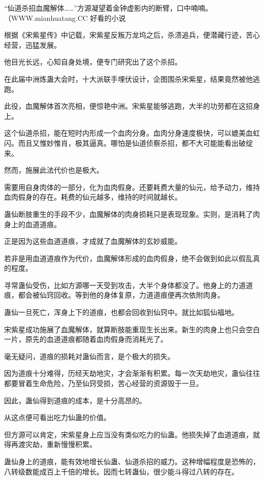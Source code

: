 
\begin{this_body}

“仙道杀招血魔解体……”方源凝望着金钟虚影内的断臂，口中喃喃。（WWW.mianhuatang.CC 好看的小说

根据《宋紫星传》中记载，宋紫星反叛万龙坞之后，杀溃追兵，便潜藏行迹，苦心经营，迅猛发展。

他目光长远，心知自身处境，便专门研究出了这个杀招。

在此届中洲炼蛊大会时，十大派联手埋伏设计，企图围杀宋紫星，结果竟然被他逃跑。

此役，血魔解体首次亮相，便惊艳中洲。宋紫星能够逃跑，大半的功劳都在这招身上。

这个仙道杀招，能在短时内形成一个血肉分身。血肉分身速度极快，可以媲美血虹闪。而且又惟妙惟肖，极其逼真。哪怕是仙道侦察杀招，都不大可能能看出破绽来。

然而，施展此法代价也是极大。

需要用自身肉体的一部分，化为血肉假身。还要耗费大量的仙元，给予动力，维持血肉假身的存在。耗费的仙元越多，维持的时间就越长。

蛊仙断肢重生的手段不少，血魔解体的肉身损耗只是表现现象。实则，是消耗了肉身上的血道道痕。

正是因为这些血道道痕，才成就了血魔解体的玄妙威能。

若非是用血道道痕作为代价，血魔解体形成的血肉假身，绝不会做到如此以假乱真的程度。

寻常蛊仙受伤，比如方源哪一天受到攻击，大半个身体都没了。他身上的力道道痕，都会被仙窍回收。等到他的身体复原，力道道痕便再次依附肉身。

蛊仙一旦死亡，浑身上下的道痕，也都会回收到仙窍中。就比如狐仙福地。

宋紫星成功施展了血魔解体，就算断肢能重现生长出来。新生的肉身上也只会空白一片，原先的血道道痕都随着血肉假身而消耗光了。

毫无疑问，道痕的损耗对蛊仙而言，是个极大的损失。

因为道痕十分难得，历经天劫地灾，才会渐渐有积累。每一次天劫地灾，蛊仙往往都要冒着生命危险，乃至仙窍受损，苦心经营的资源毁于一旦。

因此，蛊仙得到道痕的成本，是十分高昂的。

从这点便可看出吃力仙蛊的价值。

但方源可以肯定，宋紫星身上应当没有类似吃力的仙蛊。他损失掉了血道道痕，就得再渡灾劫，重新慢慢积累。

蛊仙身上的道痕，能有效地增长仙蛊、仙道杀招的威力。这种增幅程度是恐怖的，八转级数能成百上千倍的增长。因而七转蛊仙，很少能斗得过八转的存在。


\end{this_body}
